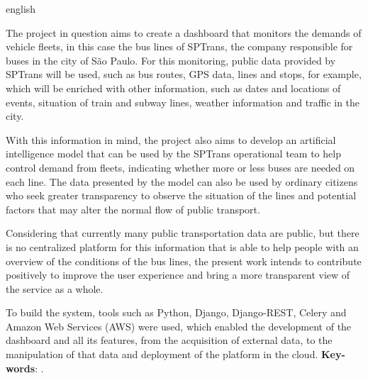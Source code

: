 \begin{resumo}[Abstract]
	\begin{otherlanguage*}{english}
	\indent
	\par The project in question aims to create a dashboard that monitors the demands of vehicle fleets, in this case the bus lines of SPTrans, the company responsible for buses in the city of São Paulo. For this monitoring, public data provided by SPTrans will be used, such as bus routes, GPS data, lines and stops, for example, which will be enriched with other information, such as dates and locations of events, situation of train and subway lines, weather information and traffic in the city.
\par With this information in mind, the project also aims to develop an artificial intelligence model that can be used by the SPTrans operational team to help control demand from fleets, indicating whether more or less buses are needed on each line. The data presented by the model can also be used by ordinary citizens who seek greater transparency to observe the situation of the lines and potential factors that may alter the normal flow of public transport.
\par Considering that currently many public transportation data are public, but there is no centralized platform for this information that is able to help people with an overview of the conditions of the bus lines, the present work intends to contribute positively to improve the user experience and bring a more transparent view of the service as a whole.
\par To build the system, tools such as Python, Django, Django-REST, Celery and Amazon Web Services (AWS) were used, which enabled the development of the dashboard and all its features, from the acquisition of external data, to the manipulation of that data and deployment of the platform in the cloud.
		\textbf{Key-words}: \KeyWordA.~
	\end{otherlanguage*}
\end{resumo}
